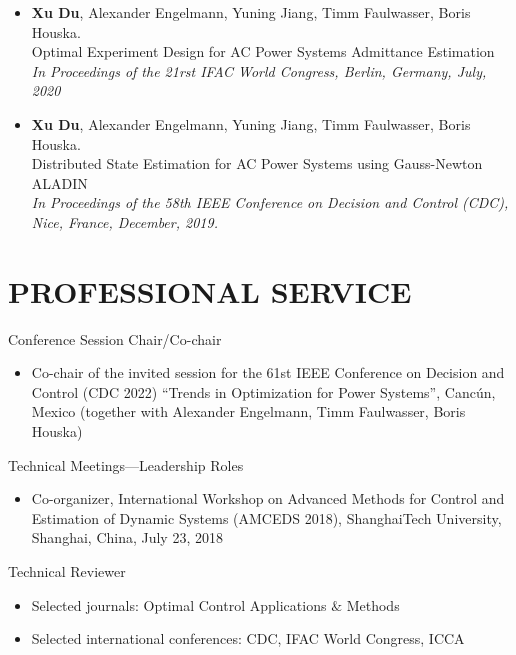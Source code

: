 \documentclass[paper=a4,fontsize=11pt]{scrartcl} %
\newcommand{\NewPart}[1]{\section*{\uppercase{#1}}}
\newcommand{\EducationEntry}[4]{
	\noindent \textbf{#1} \hfill      %
	\colorbox{White}{%
		\parbox{5cm}{%
			\hfill\color{Black}#2}} \par  %
	\noindent \textit{#3} \par        %
	\noindent\hangindent=2em\hangafter=0 \small #4 %
	\normalsize \par}
\begin{document}
\begin{itemize}
			\item  {\textbf{Xu Du}, Alexander Engelmann, Yuning Jiang, Timm Faulwasser, Boris Houska. \\
				Optimal Experiment Design for AC Power Systems Admittance Estimation\\
				\emph{In Proceedings of the 21rst IFAC World Congress, Berlin, Germany, July, 2020
			} }
			
			\item  {\textbf{Xu Du}, Alexander Engelmann, Yuning Jiang, Timm Faulwasser, Boris Houska. \\
				Distributed State Estimation for AC Power Systems using Gauss-Newton ALADIN \\
				\emph{In Proceedings of the 58th IEEE Conference on Decision and Control (CDC),
					Nice, France, December, 2019.} }
		\end{itemize}
		
		\NewPart{Professional Service}{Conference Session Chair/Co-chair}
			\begin{itemize}
				\item{Co-chair of the invited session for the 61st
					IEEE Conference on Decision and Control (CDC 2022)
					“Trends in Optimization for Power Systems”, Canc\'un, Mexico} (together with Alexander Engelmann, Timm Faulwasser, Boris Houska)
			\end{itemize}
			{Technical Meetings—Leadership Roles}
			\begin{itemize}
				\item{Co-organizer, International Workshop on Advanced Methods for Control and Estimation of Dynamic
					Systems (AMCEDS 2018), ShanghaiTech University, Shanghai, China, July 23, 2018}
			\end{itemize}
			{Technical Reviewer}
			\begin{itemize}
				\item Selected journals: Optimal Control Applications $\&$ Methods
				\item Selected international conferences: CDC, IFAC World Congress, ICCA
			\end{itemize}
			
\end{document}
